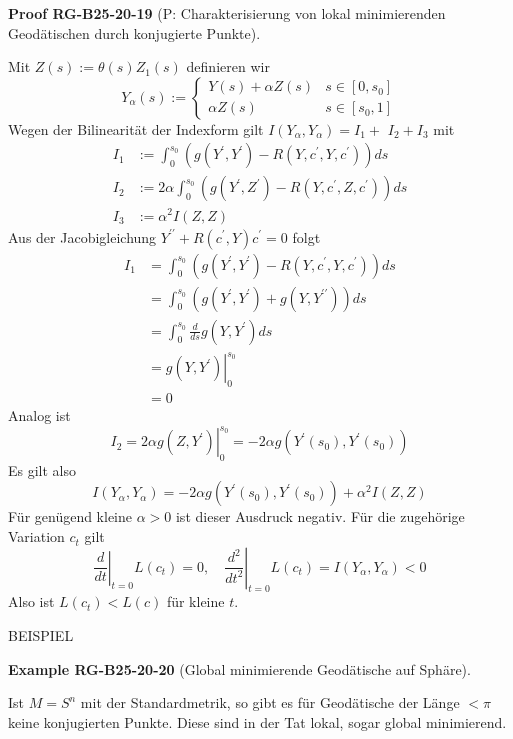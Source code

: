 \documentclass[10pt, letterpaper]{article}
\newcommand{\CustomHeading}[3]{%
  \par\medskip\noindent%
  \textbf{#1 #2} \textnormal{(#3)}.\enskip%
}
\newenvironment{EXA}[2]{\begin{unitbox}\CustomHeading{Example}{#1}{#2}}{\end{unitbox}}
\newenvironment{PROOF}[2]{\begin{unitbox}\CustomHeading{Proof}{#1}{#2}}{\end{unitbox}}
\begin{document}
\begin{PROOF}{RG-B25-20-19}{P: Charakterisierung von lokal minimierenden Geodätischen durch konjugierte Punkte}
Mit $Z(s):=\theta(s) Z_{1}(s)$ definieren wir
$$
Y_{\alpha}(s):=\left\{\begin{array}{cl}
Y(s)+\alpha Z(s) & s \in\left[0, s_{0}\right] \\
\alpha Z(s) & s \in\left[s_{0}, 1\right]
\end{array}\right.
$$
Wegen der Bilinearität der Indexform gilt $I\left(Y_{\alpha}, Y_{\alpha}\right)=I_{1}+$ $I_{2}+I_{3}$ mit
$$
\begin{aligned}
I_{1} & :=\int_{0}^{s_{0}}\left(g\left(Y^{\prime}, Y^{\prime}\right)-R\left(Y, c^{\prime}, Y, c^{\prime}\right)\right) d s \\
I_{2} & :=2 \alpha \int_{0}^{s_{0}}\left(g\left(Y^{\prime}, Z^{\prime}\right)-R\left(Y, c^{\prime}, Z, c^{\prime}\right)\right) d s \\
I_{3} & :=\alpha^{2} I(Z, Z)
\end{aligned}
$$
Aus der Jacobigleichung $Y^{\prime \prime}+R\left(c^{\prime}, Y\right) c^{\prime}=0$ folgt
$$
\begin{aligned}
I_{1} & =\int_{0}^{s_{0}}\left(g\left(Y^{\prime}, Y^{\prime}\right)-R\left(Y, c^{\prime}, Y, c^{\prime}\right)\right) d s \\
& =\int_{0}^{s_{0}}\left(g\left(Y^{\prime}, Y^{\prime}\right)+g\left(Y, Y^{\prime \prime}\right)\right) d s \\
& =\int_{0}^{s_{0}} \frac{d}{d s} g\left(Y, Y^{\prime}\right) d s \\
& =\left.g\left(Y, Y^{\prime}\right)\right|_{0} ^{s_{0}} \\
& =0
\end{aligned}
$$
Analog ist
$$
I_{2}=\left.2 \alpha g\left(Z, Y^{\prime}\right)\right|_{0} ^{s_{0}}=-2 \alpha g\left(Y^{\prime}\left(s_{0}\right), Y^{\prime}\left(s_{0}\right)\right)
$$
Es gilt also
$$
I\left(Y_{\alpha}, Y_{\alpha}\right)=-2 \alpha g\left(Y^{\prime}\left(s_{0}\right), Y^{\prime}\left(s_{0}\right)\right)+\alpha^{2} I(Z, Z)
$$
Für genügend kleine $\alpha>0$ ist dieser Ausdruck negativ. Für die zugehörige Variation $c_{t}$ gilt
$$
\left.\frac{d}{d t}\right|_{t=0} L\left(c_{t}\right)=0,\left.\quad \frac{d^{2}}{d t^{2}}\right|_{t=0} L\left(c_{t}\right)=I\left(Y_{\alpha}, Y_{\alpha}\right)<0
$$
Also ist $L\left(c_{t}\right)<L(c)$ für kleine $t$.
\end{PROOF}



BEISPIEL


\begin{EXA}{RG-B25-20-20}{Global minimierende Geodätische auf Sphäre}
Ist $M=S^{n}$ mit der Standardmetrik, so gibt es für Geodätische der Länge $<\pi$ keine konjugierten Punkte. Diese sind in der Tat lokal, sogar global minimierend.
\end{EXA}
\end{document}
